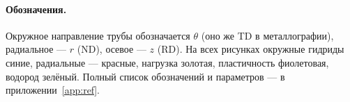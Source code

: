 
\paragraph{Обозначения.} Окружное направление трубы обозначается $\theta$ (оно же TD в
металлографии), радиальное --- $r$ (ND), осевое --- $z$ (RD). На всех рисунках
\textcolor{circ}{окружные} гидриды синие, \textcolor{rad}{радиальные} --- красные, нагрузка
\textcolor{load}{золотая}, пластичность \textcolor{plast}{фиолетовая}, водород \textcolor{hydr}{зелёный}.
Полный список обозначений и параметров --- в приложении~\ref{app:ref}.
